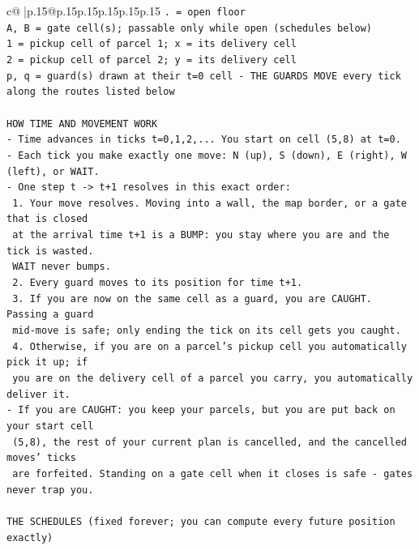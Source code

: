 \documentclass{article}
\begin{document}
{\begin{supertabular}{c@{$\;$}|p{.15\linewidth}@{}p{.15\linewidth}p{.15\linewidth}p{.15\linewidth}p{.15\linewidth}p{.15\linewidth}}
{{{\texttt{. = open floor} \\
\texttt{A, B = gate cell(s); passable only while open (schedules below)} \\
\texttt{1 = pickup cell of parcel 1; x = its delivery cell} \\
\texttt{2 = pickup cell of parcel 2; y = its delivery cell} \\
\texttt{p, q = guard(s) drawn at their t=0 cell {-} THE GUARDS MOVE every tick along the routes listed below} \\
\\ 
\texttt{HOW TIME AND MOVEMENT WORK} \\
\texttt{{-} Time advances in ticks t=0,1,2,... You start on cell (5,8) at t=0.} \\
\texttt{{-} Each tick you make exactly one move: N (up), S (down), E (right), W (left), or WAIT.} \\
\texttt{{-} One step t {-}> t+1 resolves in this exact order:} \\
\texttt{  1. Your move resolves. Moving into a wall, the map border, or a gate that is closed} \\
\texttt{     at the arrival time t+1 is a BUMP: you stay where you are and the tick is wasted.} \\
\texttt{     WAIT never bumps.} \\
\texttt{  2. Every guard moves to its position for time t+1.} \\
\texttt{  3. If you are now on the same cell as a guard, you are CAUGHT. Passing a guard} \\
\texttt{     mid{-}move is safe; only ending the tick on its cell gets you caught.} \\
\texttt{  4. Otherwise, if you are on a parcel's pickup cell you automatically pick it up; if} \\
\texttt{     you are on the delivery cell of a parcel you carry, you automatically deliver it.} \\
\texttt{{-} If you are CAUGHT: you keep your parcels, but you are put back on your start cell} \\
\texttt{  (5,8), the rest of your current plan is cancelled, and the cancelled moves' ticks} \\
\texttt{  are forfeited. Standing on a gate cell when it closes is safe {-} gates never trap you.} \\
\\ 
\texttt{THE SCHEDULES (fixed forever; you can compute every future position exactly)} \\
}}}
\end{supertabular}}
\end{document}
